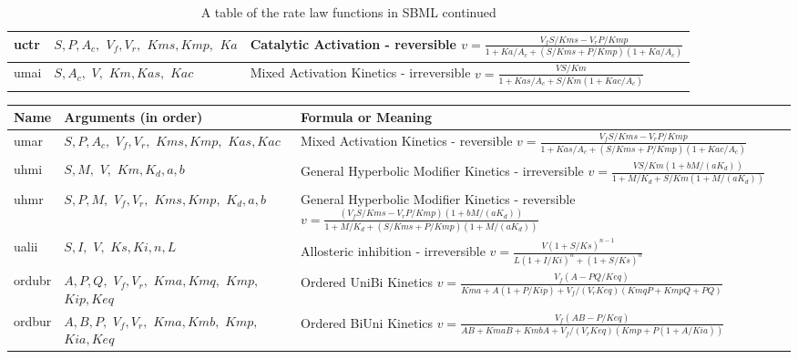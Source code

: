 \documentclass[10pt]{article}
\begin{document}
\begin{table}[h]
\begin{tabular}{|p{1cm}|p{2cm}|p{13cm}|}
uctr & $ S, P, A_c, $ $ V_f, V_r, $ $ Kms, Kmp, $ $ Ka $ &
Catalytic Activation - reversible $ v = \frac{V_f S/Kms - V_r
P/Kmp}{1 +
Ka/A_c + \left( S/Kms + P/Kmp\right) \left( 1 + Ka/A_c\right)} $ \\
\hline

umai & $ S, A_c, $ $ V, $ $ Km, Kas, $ $Kac $ & Mixed Activation
Kinetics - irreversible $ v
= \frac{V S/Km}{1 + Kas/A_c + S/Km \left( 1 + Kac/A_c\right)} $\\
\hline

\end{tabular}
\caption{A table of the rate law functions in SBML continued}
\end{table}
\addtocounter{table}{-1}

\begin{table}[h]
\begin{tabular}{|p{1cm}|p{2cm}|p{13cm}|}
\hline
Name & Arguments (in order) & Formula or Meaning \\ \hline

umar & $ S, P, A_c, $ $ V_f, V_r, $ $ Kms, Kmp, $ $ Kas, Kac $ &
 Mixed Activation Kinetics - reversible $ v =
\frac{V_f S/Kms - V_r P/Kmp}{1 + Kas/A_c + \left( S/Kms +
P/Kmp\right) \left( 1 + Kac/A_c\right)} $ \\ \hline

uhmi & $ S, M,$ $V, $ $ Km, K_d, a, b $ & General Hyperbolic
Modifier Kinetics - irreversible $ v = \frac{V S/Km \left( 1 + b
M / (a
K_d)\right) }{1 + M/K_d + S/Km \left( 1 + M/(a K_d)\right)} $ \\
\hline

uhmr & $ S, P, M, $ $ V_f, V_r, $ $ Kms, Kmp, $ $ K_d, a, b $ &
General Hyperbolic Modifier Kinetics - reversible $ v =
\frac{\left( V_f S/Kms - V_r P/Kmp\right) \left( 1 + b M / (a
K_d)\right) }{1 + M/K_d + \left( S/Kms + P/Kmp \right) \left( 1 +
M/(a K_d)\right)} $ \\ \hline

ualii & $ S, I,$ $ V, $ $ Ks, Ki, n, L $ & Allosteric inhibition -
irreversible $ v = \frac{V \left( 1 + S/Ks\right)^{n-1}}{L \left(
1 + I/Ki\right)^n + \left( 1 + S/Ks \right)^n} $ \\ \hline

ordubr & $ A, P, Q, $ $ V_f, V_r, $ $ Kma, Kmq, $ $ Kmp, $ $ Kip,
Keq $ & Ordered UniBi Kinetics $ v = \frac{V_f \left( A - P
Q/Keq\right)}{Kma + A \left( 1 + P/Kip\right) + V_f/(V_r Keq)
\left( Kmq P + Kmp Q + P Q\right)} $ \\ \hline

ordbur & $ A, B, P, $ $ V_f, V_r, $ $ Kma, Kmb, $ $ Kmp, $ $ Kia,
Keq $ & Ordered BiUni Kinetics $ v = \frac{V_f \left( A B -
P/Keq\right)}{A B + Kma B + Kmb A + V_f/(V_r Keq) \left( Kmp + P
\left( 1 + A/Kia\right) \right) } $ \\ \hline


\end{tabular}
\end{table}
\end{document}
